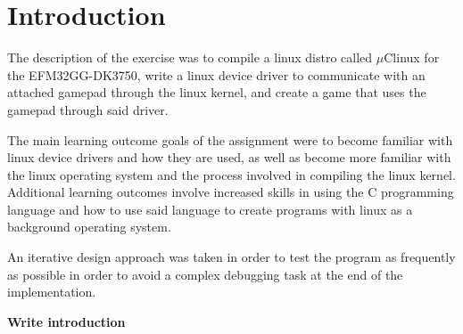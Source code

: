 \section{Introduction}

The description of the exercise was to compile a linux distro called $\mu$Clinux for the EFM32GG-DK3750, write a linux device driver to communicate with an attached gamepad through the linux kernel, and create a game that uses the gamepad through said driver.

The main learning outcome goals of the assignment were to become familiar with linux device drivers and how they are used, as well as become more familiar with the linux operating system and the process involved in compiling the linux kernel. Additional learning outcomes involve increased skills in using the C programming language and how to use said language to create programs with linux as a background operating system.

An iterative design approach was taken in order to test the program as frequently as possible in order to avoid a complex debugging task at the end of the implementation.

{\bf Write introduction}




